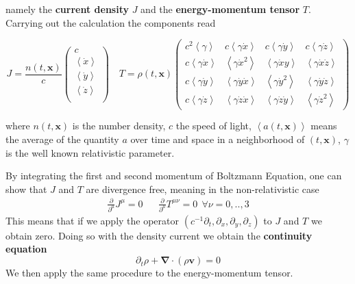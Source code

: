 namely the \textbf{current density} $J$ and the \textbf{energy-momentum tensor} $T$. Carrying out the calculation the components read 


\[
  J= \frac{n(t,\mathbf{x})}{c}
  \begin{pmatrix}
    c \\
    \left< \dot{x} \right> \\
    \left< \dot{y} \right> \\
    \left< \dot{z} \right> \\
  \end{pmatrix}\quad
  T= \rho(t,\mathbf{x})
  \begin{pmatrix}
    c^2 \left< \gamma \right> & c \left< \gamma \dot{x} \right> &  c \left< \gamma \dot{y} \right> & c \left< \gamma \dot{z} \right> \\
     c \left< \gamma \dot{x} \right> & \left< \gamma \dot{x}^2 \right> &  \left< \gamma \dot{x}y \right> &  \left< \gamma \dot{x} \dot{z} \right>  \\
     c \left< \gamma \dot{y} \right> &  \left< \gamma \dot{y} \dot{x} \right>&  \left< \gamma \dot{y}^2 \right> &  \left< \gamma \dot{y} \dot{z} \right>  \\
     c \left< \gamma \dot{z} \right> &  \left< \gamma \dot{z}\dot{x} \right>& \left< \gamma \dot{z}\dot{y} \right> &  \left< \gamma \dot{z}^2 \right> 
  \end{pmatrix}
\]

where $n(t, \mathbf{x})$ is the number density, $c$ the speed of light,  $\left< a(t,\mathbf{x}) \right>$ means the average of the quantity $a$ over time and space in a neighborhood of $(t, \mathbf{x})$, $\gamma$ is the well known relativistic parameter.

By integrating the first and second momentum of Boltzmann Equation, one can show that $J$ and $T$ are divergence free, meaning in the non-relativistic case
\begin{align}
\frac{\partial }{\partial^{\mu}}J^{\mu}=0 && \frac{\partial }{\partial^{\mu}}T^{\mu \nu}=0 \  \  \forall \nu =0,..,3 
\end{align}
This means that if we apply the operator $(c^{-1}\partial_t,\partial_x,\partial_y,\partial_z)$ to $J$ and $T$ we obtain zero. Doing so with the density current we obtain the \textbf{continuity equation}
\begin{equation} \label{cont}
	\partial_t \rho + \mathbf{\nabla} \cdot (\rho \mathbf{v})=0
\end{equation}
We then apply the same procedure to the energy-momentum tensor.


